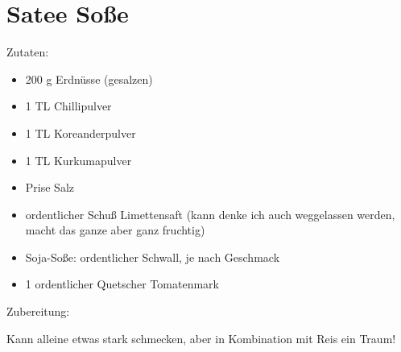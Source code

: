 \section{Satee Soße}

Zutaten:
\begin{itemize}
	\item 200 g Erdnüsse (gesalzen)
	\item 1 TL Chillipulver
	\item 1 TL Koreanderpulver
	\item 1 TL Kurkumapulver
	\item Prise Salz
	\item ordentlicher Schuß Limettensaft (kann denke ich auch weggelassen
		werden, macht das ganze aber ganz fruchtig)
	\item Soja-Soße: ordentlicher Schwall, je nach Geschmack
	\item 1 ordentlicher Quetscher Tomatenmark
\end{itemize}

\noindent Zubereitung:

\noindent

Kann alleine etwas stark schmecken, aber in Kombination mit Reis ein Traum!

\newpage
\mbox{}
\vfill
\begin{center}

\end{center}
\vfill
\mbox{ }
\newpage
